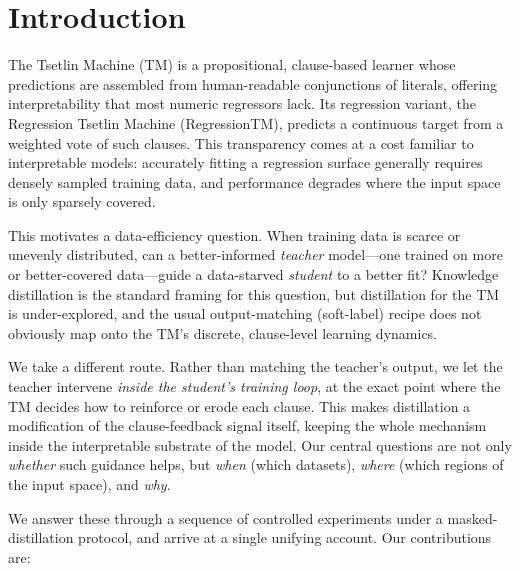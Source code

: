 \section{Introduction}
\label{sec:intro}

The Tsetlin Machine (TM) is a propositional, clause-based learner whose predictions are
assembled from human-readable conjunctions of literals, offering interpretability that
most numeric regressors lack. Its regression variant, the Regression Tsetlin Machine
(RegressionTM), predicts a continuous target from a weighted vote of such clauses. This
transparency comes at a cost familiar to interpretable models: accurately fitting a
regression surface generally requires densely sampled training data, and performance
degrades where the input space is only sparsely covered.

This motivates a data-efficiency question. When training data is scarce or unevenly
distributed, can a better-informed \emph{teacher} model---one trained on more or
better-covered data---guide a data-starved \emph{student} to a better fit? Knowledge
distillation is the standard framing for this question, but distillation for the TM is
under-explored, and the usual output-matching (soft-label) recipe does not obviously map
onto the TM's discrete, clause-level learning dynamics.

We take a different route. Rather than matching the teacher's output, we let the teacher
intervene \emph{inside the student's training loop}, at the exact point where the TM
decides how to reinforce or erode each clause. This makes distillation a modification of
the clause-feedback signal itself, keeping the whole mechanism inside the interpretable
substrate of the model. Our central questions are not only \emph{whether} such guidance
helps, but \emph{when} (which datasets), \emph{where} (which regions of the input space),
and \emph{why}.

We answer these through a sequence of controlled experiments under a masked-distillation
protocol, and arrive at a single unifying account. Our contributions are:

